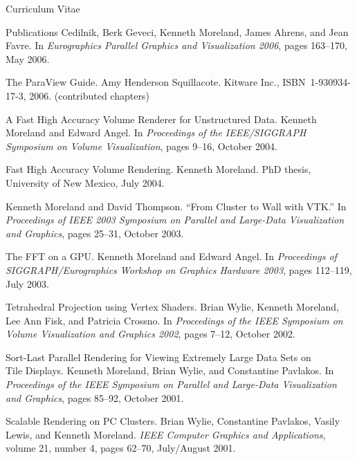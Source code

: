 \documentclass{article}
\begin{document}
\begin{cv}{Curriculum Vitae}
\begin{cvlist}{Publications}
      Cedilnik, Berk Geveci, Kenneth Moreland, James Ahrens, and Jean
      Favre.  In \emph{Eurographics Parallel Graphics and Visualization
        2006}, pages 163--170, May 2006.
    \item[The ParaView Guide.] Amy Henderson Squillacote.  Kitware
      Inc., ISBN~1-930934-17-3, 2006. (contributed chapters)
    \item[A Fast High Accuracy Volume Renderer for Unstructured Data.]
      Kenneth Moreland and Edward Angel.  In \emph{Proceedings of the
        IEEE/SIGGRAPH Symposium on Volume Visualization}, pages 9--16,
      October 2004.
    \item[Fast High Accuracy Volume Rendering.] Kenneth Moreland.  PhD
      thesis, University of New Mexico, July 2004.
    \item Kenneth Moreland and David Thompson.  ``From Cluster to Wall
      with VTK.''  In \emph{Proceedings of IEEE 2003 Symposium on
      Parallel and Large-Data Visualization and Graphics}, pages 25--31,
      October 2003.
    \item[The FFT on a GPU.] Kenneth Moreland and Edward Angel.  In
      \emph{Proceedings of SIGGRAPH/Eurographics Workshop on Graphics
        Hardware 2003}, pages 112--119, July 2003.
    \item[Tetrahedral Projection using Vertex Shaders.] Brian Wylie,
      Kenneth Moreland, Lee Ann Fisk, and Patricia Crossno.  In
      \emph{Proceedings of the IEEE Symposium on Volume Visualization and
        Graphics 2002}, pages 7--12, October 2002.
    \item[Sort-Last Parallel Rendering for Viewing Extremely Large Data
      Sets on]~\\ Tile Displays. Kenneth Moreland, Brian Wylie, and
      Constantine Pavlakos.  In \emph{Proceedings of the IEEE Symposium on
        Parallel and Large-Data Visualization and Graphics}, pages 85--92,
      October 2001.
    \item[Scalable Rendering on PC Clusters.] Brian Wylie, Constantine
      Pavlakos, Vasily Lewis, and Kenneth Moreland.  \emph{IEEE Computer
        Graphics and Applications}, volume 21, number 4, pages 62--70,
      July/August 2001.
    \end{cvlist}


\end{cv}
\end{document}

